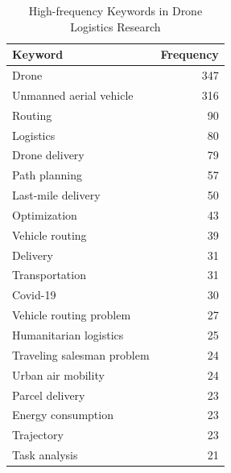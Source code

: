 \documentclass{article}
\begin{document}
\begin{table}[htbp]
  \centering
  \caption{High-frequency Keywords in Drone Logistics Research}
  \label{tab:keyword_frequency}
  \begin{tabular}{@{} l r @{}} %
    \toprule
    \textbf{Keyword} & \textbf{Frequency} \\
    \midrule
    Drone & 347 \\
    Unmanned aerial vehicle & 316 \\
    Routing & 90 \\
    Logistics & 80 \\
    Drone delivery & 79 \\
    Path planning & 57 \\
    Last-mile delivery & 50 \\
    Optimization & 43 \\
    Vehicle routing & 39 \\
    Delivery & 31 \\
    Transportation & 31 \\
    Covid-19 & 30 \\
    Vehicle routing problem & 27 \\
    Humanitarian logistics & 25 \\
    Traveling salesman problem & 24 \\
    Urban air mobility & 24 \\
    Parcel delivery & 23 \\
    Energy consumption & 23 \\
    Trajectory & 23 \\
    Task analysis & 21 \\
    \bottomrule
  \end{tabular}
\end{table}
\end{document}
